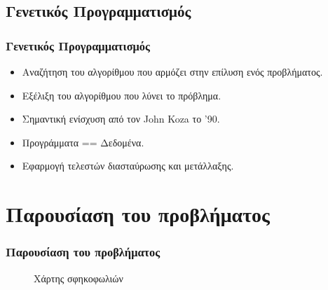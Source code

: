 \documentclass[xetex,mathserif,serif,14pt]{beamer}
\begin{document}
\subsection{Γενετικός Προγραμματισμός}

\begin{frame}
\frametitle{Γενετικός Προγραμματισμός}
\begin{itemize}
  \item Αναζήτηση του αλγορίθμου που αρμόζει στην επίλυση ενός προβλήματος.
  \item Εξέλιξη του αλγορίθμου που λύνει το πρόβλημα.
  \item Σημαντική ενίσχυση από τον John Koza το '90.
  \item Προγράμματα == Δεδομένα.
  \item Εφαρμογή τελεστών διασταύρωσης και μετάλλαξης.
\end{itemize}
\end{frame}


\section{Παρουσίαση του προβλήματος}

\begin{frame}
\frametitle{Παρουσίαση του προβλήματος}
\begin{figure}[!t]
    \centering
    \caption{Χάρτης σφηκοφωλιών}
    \label{fig_waspNestsMap}
\end{figure}
\end{frame}

\end{document}
